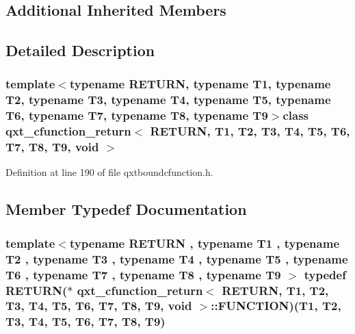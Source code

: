 \subsection*{Additional Inherited Members}


\subsection{Detailed Description}
\subsubsection*{template$<$typename R\-E\-T\-U\-R\-N, typename T1, typename T2, typename T3, typename T4, typename T5, typename T6, typename T7, typename T8, typename T9$>$class qxt\-\_\-cfunction\-\_\-return$<$ R\-E\-T\-U\-R\-N, T1, T2, T3, T4, T5, T6, T7, T8, T9, void $>$}



Definition at line 190 of file qxtboundcfunction.\-h.



\subsection{Member Typedef Documentation}
\hypertarget{classqxt__cfunction__return_3_01_r_e_t_u_r_n_00_01_t1_00_01_t2_00_01_t3_00_01_t4_00_01_t5_00_01_b7d70bab006ab9ddd1770ed96f596c1d_a111ea35a26f81a9f6a4080112d08b4d8}{
\subsubsection[{F\-U\-N\-C\-T\-I\-O\-N}]{\setlength{\rightskip}{0pt plus 5cm}template$<$typename R\-E\-T\-U\-R\-N , typename T1 , typename T2 , typename T3 , typename T4 , typename T5 , typename T6 , typename T7 , typename T8 , typename T9 $>$ typedef R\-E\-T\-U\-R\-N($\ast$ {\bf qxt\-\_\-cfunction\-\_\-return}$<$ R\-E\-T\-U\-R\-N, T1, T2, T3, T4, T5, T6, T7, T8, T9, {\bf void} $>$\-::F\-U\-N\-C\-T\-I\-O\-N)(T1, T2, T3, T4, T5, T6, T7, T8, T9)}}\label{classqxt__cfunction__return_3_01_r_e_t_u_r_n_00_01_t1_00_01_t2_00_01_t3_00_01_t4_00_01_t5_00_01_b7d70bab006ab9ddd1770ed96f596c1d_a111ea35a26f81a9f6a4080112d08b4d8}


